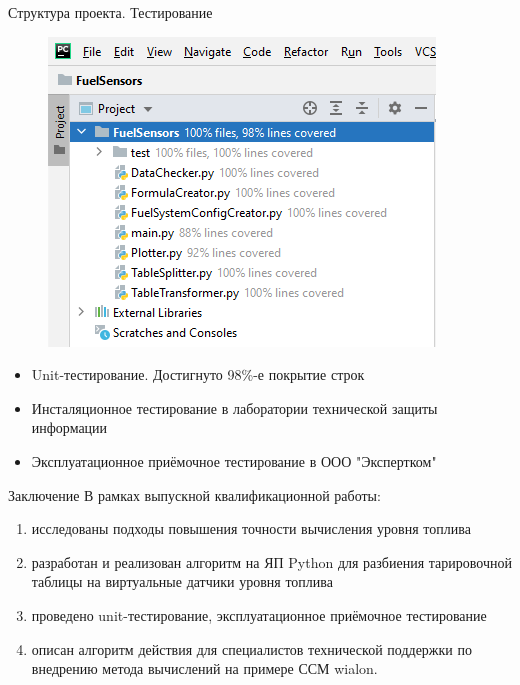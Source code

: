 \documentclass[usenames,dvipsnames,11pt]{beamer}
\begin{document}
\begin{frame}{Структура проекта. Тестирование}
	
	\begin{minipage}[h]{0.39\linewidth}
		\begin{figure}
			\centering
			\includegraphics[width=1\linewidth]{graphics/screenshot001}
		\end{figure}
	\end{minipage}
	\hfill
	\begin{minipage}[h]{0.59\linewidth}
		\begin{itemize}
			\item Unit-тестирование. Достигнуто 98\%-е покрытие строк
			\item Инсталяционное тестирование в лаборатории технической защиты информации
			\item Эксплуатационное приёмочное тестирование в ООО "Экспертком"
		\end{itemize}
	\end{minipage}
	
\end{frame}	

\begin{frame}{Заключение}
	В рамках выпускной квалификационной работы:
	\begin{enumerate}
		\item исследованы подходы повышения точности вычисления уровня топлива
		\item разработан и реализован алгоритм на ЯП Python для разбиения тарировочной таблицы на виртуальные датчики уровня топлива
		\item проведено unit-тестирование, эксплуатационное приёмочное тестирование
		\item описан алгоритм действия для специалистов технической поддержки по внедрению метода вычислений на примере ССМ wialon.			
	\end{enumerate}
\end{frame}	
\end{document}
